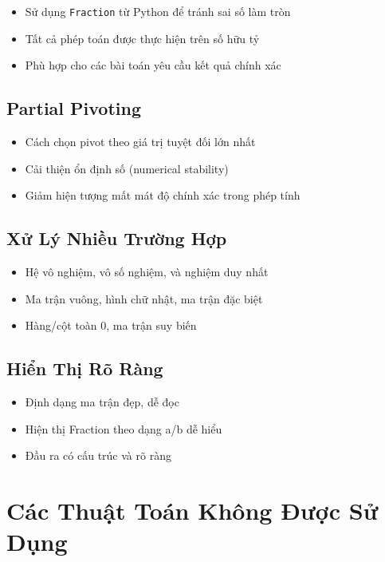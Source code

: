 \documentclass[12pt, a4paper, twoside]{article}
\begin{document}
\begin{itemize}
    \item Sử dụng \texttt{Fraction} từ Python để tránh sai số làm tròn
    \item Tất cả phép toán được thực hiện trên số hữu tỷ
    \item Phù hợp cho các bài toán yêu cầu kết quả chính xác
\end{itemize}

\subsection{Partial Pivoting}

\begin{itemize}
    \item Cách chọn pivot theo giá trị tuyệt đối lớn nhất
    \item Cải thiện ổn định số (numerical stability)
    \item Giảm hiện tượng mất mát độ chính xác trong phép tính
\end{itemize}

\subsection{Xử Lý Nhiều Trường Hợp}

\begin{itemize}
    \item Hệ vô nghiệm, vô số nghiệm, và nghiệm duy nhất
    \item Ma trận vuông, hình chữ nhật, ma trận đặc biệt
    \item Hàng/cột toàn 0, ma trận suy biến
\end{itemize}

\subsection{Hiển Thị Rõ Ràng}

\begin{itemize}
    \item Định dạng ma trận đẹp, dễ đọc
    \item Hiện thị Fraction theo dạng a/b dễ hiểu
    \item Đầu ra có cấu trúc và rõ ràng
\end{itemize}

\newpage

\section{Các Thuật Toán Không Được Sử Dụng}
\end{document}
